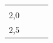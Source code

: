 {\begin{center}
\begin{xtabular*}{\mytablewidth}[t]{|p{10\mystarwidth}|p{10\mystarwidth}|p{10\mystarwidth}|p{10\mystarwidth}|}
    
         &
    
    
         &
    
    
     \tabularnewline{}
    
    
        2,0 &
    
    
         &
    
    
         &
    
    
     \tabularnewline{}
    
    
        2,5 &
    
    

\end{xtabular*}
\end{center}}
